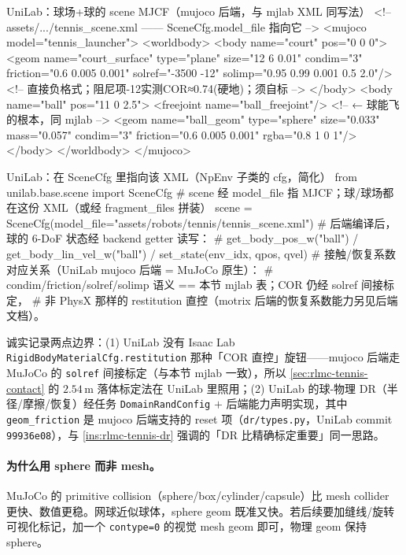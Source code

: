 \begin{codebox}[text]{UniLab：球场+球的 scene MJCF（mujoco 后端，与 mjlab XML 同写法）}
<!-- assets/.../tennis_scene.xml —— SceneCfg.model_file 指向它 -->
<mujoco model="tennis_launcher">
  <worldbody>
    <body name="court" pos="0 0 0">
      <geom name="court_surface" type="plane" size="12 6 0.01"
            condim="3" friction="0.6 0.005 0.001"
            solref="-3500 -12" solimp="0.95 0.99 0.001 0.5 2.0"/>  <!-- 直接负格式；阻尼项-12实测COR≈0.74(硬地)；须自标 -->
    </body>
    <body name="ball" pos="11 0 2.5">
      <freejoint name="ball_freejoint"/>            <!-- ← 球能飞的根本，同 mjlab -->
      <geom name="ball_geom" type="sphere" size="0.033" mass="0.057"
            condim="3" friction="0.6 0.005 0.001" rgba="0.8 1 0 1"/>
    </body>
  </worldbody>
</mujoco>
\end{codebox}

\begin{codebox}[Python]{UniLab：在 SceneCfg 里指向该 XML（NpEnv 子类的 cfg，简化）}
from unilab.base.scene import SceneCfg
# scene 经 model_file 指 MJCF；球/球场都在这份 XML（或经 fragment_files 拼装）
scene = SceneCfg(model_file="assets/robots/tennis/tennis_scene.xml")
# 后端编译后，球的 6-DoF 状态经 backend getter 读写：
#   get_body_pos_w("ball") / get_body_lin_vel_w("ball") / set_state(env_idx, qpos, qvel)
# 接触/恢复系数对应关系（UniLab mujoco 后端 = MuJoCo 原生）：
#   condim/friction/solref/solimp 语义 == 本节 mjlab 表；COR 仍经 solref 间接标定，
#   非 PhysX 那样的 restitution 直控（motrix 后端的恢复系数能力另见后端文档）。
\end{codebox}

诚实记录两点边界：(1) UniLab 没有 Isaac Lab \verb|RigidBodyMaterialCfg.restitution| 那种「COR 直控」旋钮——mujoco 后端走 MuJoCo 的 \verb|solref| 间接标定（与本节 mjlab 一致），所以 \cref{sec:rlmc-tennis-contact} 的 $2.54$\,m 落体标定法在 UniLab 里照用；(2) UniLab 的球-物理 DR（半径/摩擦/恢复）经任务 \verb|DomainRandConfig| $+$ 后端能力声明实现，其中 \verb|geom_friction| 是 mujoco 后端支持的 reset 项（\verb|dr/types.py|，UniLab commit \texttt{99936e08}），与 \cref{ins:rlmc-tennis-dr} 强调的「DR 比精确标定重要」同一思路。

\paragraph{为什么用 sphere 而非 mesh。}MuJoCo 的 primitive collision（sphere/box/cylinder/capsule）比 mesh collider 更快、数值更稳。网球近似球体，sphere geom 既准又快。若后续要加缝线/旋转可视化标记，加一个 \verb|contype=0| 的视觉 mesh geom 即可，物理 geom 保持 sphere。

